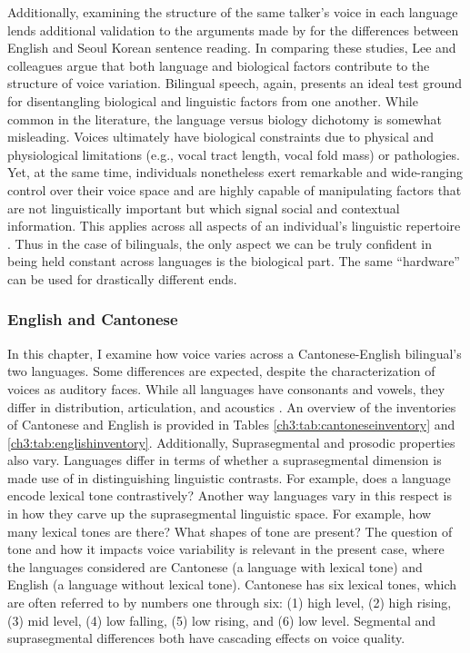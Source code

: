 Additionally, examining the structure of the same talker's voice in each language lends additional validation to the arguments made by \citet{lee_2020_language} for the differences between English and Seoul Korean sentence reading. In comparing these studies, Lee and colleagues argue that both language and biological factors contribute to the structure of voice variation. Bilingual speech, again, presents an ideal test ground for disentangling biological and linguistic factors from one another. While common in the literature, the language versus biology dichotomy is somewhat misleading. Voices ultimately have biological constraints due to physical and physiological limitations (e.g., vocal tract length, vocal fold mass) or pathologies. Yet, at the same time, individuals nonetheless exert remarkable and wide-ranging control over their voice space and are highly capable of manipulating factors that are not linguistically important but which signal social and contextual information. This applies across all aspects of an individual's linguistic repertoire \citep{bullock_2009_sociophonetics,wei_2018_translanguaging}. Thus in the case of bilinguals, the only aspect we can be truly confident in being held constant across languages is the biological part. The same ``hardware'' can be used for drastically different ends. 

\subsubsection{English and Cantonese}

In this chapter, I examine how voice varies across a Cantonese-English bilingual's two languages. Some differences are expected, despite the characterization of voices as auditory faces. While all languages have consonants and vowels, they differ in distribution, articulation, and acoustics . An overview of the inventories of Cantonese and English is provided in Tables \ref{ch3:tab:cantoneseinventory} and \ref{ch3:tab:englishinventory}. Additionally, Suprasegmental and prosodic properties also vary. Languages differ in terms of whether a suprasegmental dimension is made use of in distinguishing linguistic contrasts. For example, does a language encode lexical tone contrastively? Another way languages vary in this respect is in how they carve up the suprasegmental linguistic space. For example, how many lexical tones are there? What shapes of tone are present? The question of tone and how it impacts voice variability is relevant in the present case, where the languages considered are Cantonese (a language with lexical tone) and English (a language without lexical tone). Cantonese has six lexical tones, which are often referred to by numbers one through six: (1) high level, (2) high rising, (3) mid level, (4) low falling, (5) low rising, and (6) low level. Segmental and suprasegmental differences both have cascading effects on voice quality. 

